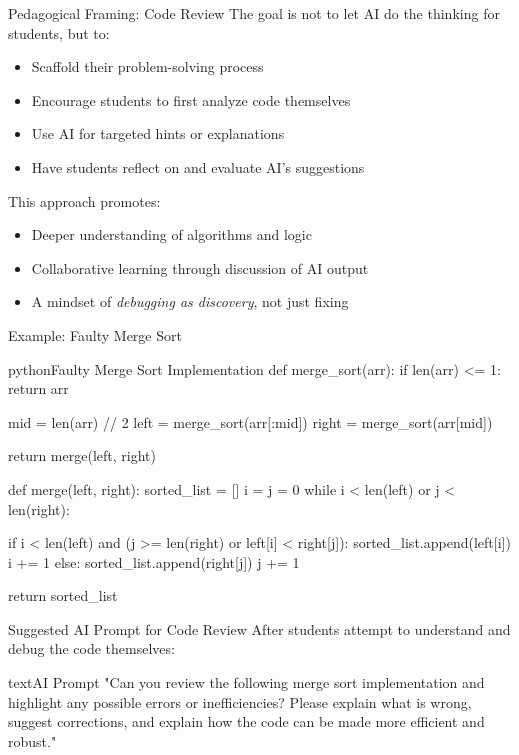 \documentclass[xcolor=dvipsnames, aspectratio=169]{beamer}
\begin{document}
\begin{frame}{Pedagogical Framing: Code Review}
  The goal is not to let AI do the thinking for students, but to:
  \begin{itemize}
    \item Scaffold their problem-solving process
    \item Encourage students to first analyze code themselves
    \item Use AI for targeted hints or explanations
    \item Have students reflect on and evaluate AI's suggestions
  \end{itemize}
  
  \begin{infobox}
    This approach promotes:
    \begin{itemize}
      \item Deeper understanding of algorithms and logic
      \item Collaborative learning through discussion of AI output
      \item A mindset of \textit{debugging as discovery}, not just fixing
    \end{itemize}
  \end{infobox}
\end{frame}

\begin{frame}[fragile]{Example: Faulty Merge Sort}
  \begin{codeboxtc}{python}{Faulty Merge Sort Implementation}{}{}
def merge_sort(arr):
    if len(arr) <= 1:
        return arr

    mid = len(arr) // 2
    left = merge_sort(arr[:mid])
    right = merge_sort(arr[mid]) 

    return merge(left, right)

def merge(left, right):
    sorted_list = []
    i = j = 0
    while i < len(left) or j < len(right):
        
        if i < len(left) and (j >= len(right) or left[i] < right[j]):
            sorted_list.append(left[i])
            i += 1
        else:
            sorted_list.append(right[j])
            j += 1

    return sorted_list
  \end{codeboxtc}
\end{frame}

\begin{frame}[fragile]{Suggested AI Prompt for Code Review}
  After students attempt to understand and debug the code themselves:
  
  \begin{codeboxtc}{text}{AI Prompt}{}{}
"Can you review the following merge sort implementation and highlight any possible errors or inefficiencies? Please explain what is wrong, suggest corrections, and explain how the code can be made more efficient and robust."
  \end{codeboxtc}
\end{frame}
\end{document}
